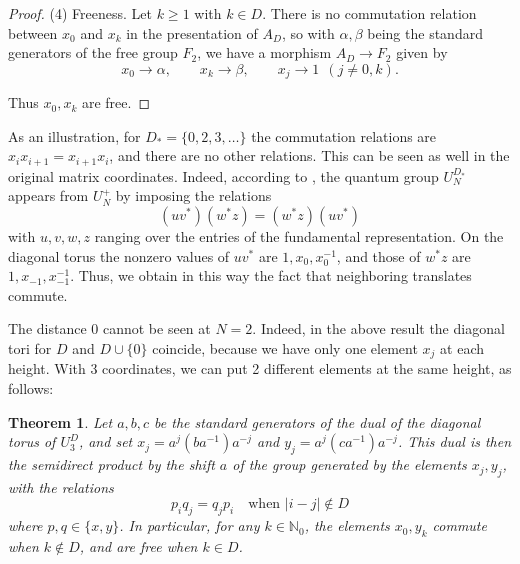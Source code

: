 \documentclass[11pt,a4paper]{article}
\newtheorem{thm}{Theorem}[section]
\begin{document}
\begin{proof}
(4) Freeness. Let $k\geq1$ with $k\in D$. There is no commutation relation between $x_0$ and $x_k$ in the presentation of $A_D$, so with $\alpha,\beta$ being the standard generators of the free group $F_2$, we have a morphism $A_D\to F_2$ given by
\[
 x_0\to\alpha,\qquad x_k\to\beta,\qquad x_j\to1\ \ (j\neq0,k).
\]

Thus $x_0,x_k$ are free.
\end{proof}

As an illustration, for $D_*=\{0,2,3,\ldots\}$ the commutation relations are $x_ix_{i+1}=x_{i+1}x_i$, and there are no other relations. This can be seen as well in the original matrix coordinates. Indeed, according to \cite{semi}, the quantum group $U_N^{D_*}$ appears from $U_N^+$ by imposing the relations
\[
 (uv^*)(w^*z)=(w^*z)(uv^*)
\]
with $u,v,w,z$ ranging over the entries of the fundamental representation. On the diagonal torus the nonzero values of $uv^*$ are $1,x_0,x_0^{-1}$, and those of $w^*z$ are $1,x_{-1},x_{-1}^{-1}$. Thus, we obtain in this way the fact that neighboring translates commute.

The distance $0$ cannot be seen at $N=2$. Indeed, in the above result the diagonal tori for $D$ and $D\cup\{0\}$ coincide, because we have only one element $x_j$ at each height. With 3 coordinates, we can put 2 different elements at the same height, as follows:

\begin{thm}\label{three-torus}
Let $a,b,c$ be the standard generators of the dual of the diagonal torus of $U_3^D$, and set $x_j=a^j(ba^{-1})a^{-j}$ and $y_j=a^j(ca^{-1})a^{-j}$. This dual is then the semidirect product by the shift $a$ of the group generated by the elements $x_j,y_j$, with the relations
\[
 p_iq_j=q_jp_i\quad\text{when }|i-j|\notin D
\]
where $p,q\in\{x,y\}$. In particular, for any $k\in\mathbb N_0$, the elements $x_0,y_k$ commute when $k\notin D$, and are free when $k\in D$.
\end{thm}
\end{document}

